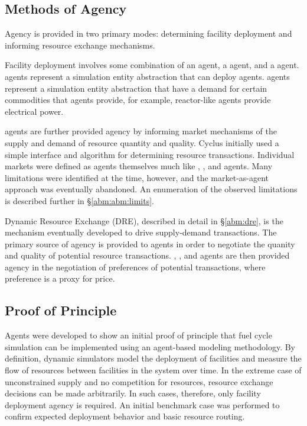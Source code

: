 \subsection{Methods of Agency}\label{abm:abm:agent}

Agency is provided in two primary modes: determining facility deployment and
informing resource exchange mechanisms. 

Facility deployment involves some combination of an  agent, a
 agent, and a  agent.  agents
represent a simulation entity abstraction that can deploy 
agents.  agents represent a simulation entity abstraction that have
a demand for certain commodities that  agents provide, for
example, reactor-like  agents provide electrical power.

 agents are further provided agency by informing market
mechanisms of the supply and demand of resource quantity and quality. Cyclus
initially used a simple interface and algorithm for determining resource
transactions. Individual markets were defined as agents themselves much like
, , and  agents. Many limitations
were identified at the time, however, and the market-as-agent approach was
eventually abandoned. An enumeration of the observed limitations is described
further in \S \ref{abm:abm:limits}.

Dynamic Resource Exchange (DRE), described in detail in \S \ref{abm:dre}, is the
mechanism eventually developed to drive supply-demand transactions. The primary
source of agency is provided to  agents in order to negotiate the
quanity and quality of potential resource transactions. ,
, and  agents are then provided agency in the
negotiation of preferences of potential transactions, where preference is a
proxy for price.

\subsection{Proof of Principle}\label{abm:abm:proof}

Agents were developed to show an initial proof of principle that fuel cycle
simulation can be implemented using an agent-based modeling methodology. By
definition, dynamic simulators model the deployment of facilities and measure
the flow of resources between facilities in the system over time. In the extreme
case of unconstrained supply and no competition for resources, resource exchange
decisions can be made arbitrarily. In such cases, therefore, only facility
deployment agency is required. An initial benchmark case was performed to
confirm expected deployment behavior and basic resource routing.

